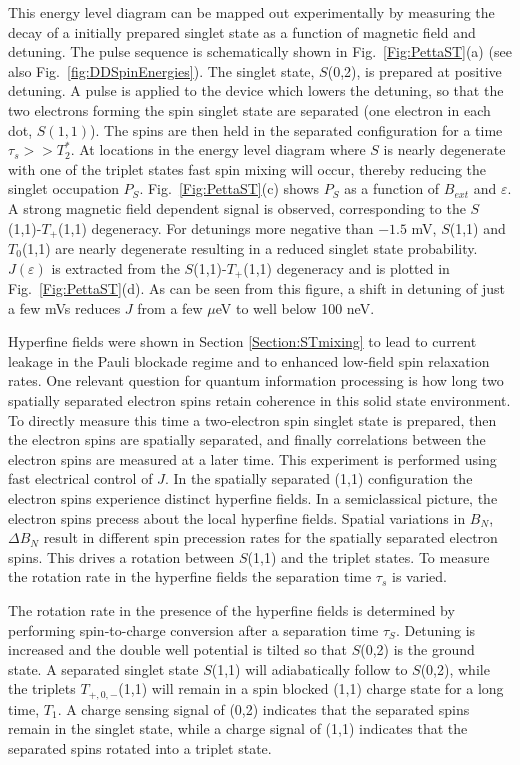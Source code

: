 \documentclass[rmp,twocolumn,aps]{revtex4}
\begin{document}
This energy level diagram can be mapped out experimentally by
measuring the decay of a initially prepared singlet state as a
function of magnetic field and detuning. The pulse sequence is
schematically shown in Fig.~\ref{Fig:PettaST}(a) (see also Fig.~\ref{fig:DDSpinEnergies}). The singlet
state, $S$(0,2), is prepared at positive detuning. A pulse is
applied to the device which lowers the detuning, so that the two electrons forming the spin singlet state are separated (one electron in each dot, $S(1,1)$). The spins are then held in the separated
configuration for a time $\tau_s$$>>$$T_2^*$. At locations in the
energy level diagram where $S$ is nearly degenerate with one of the
triplet states fast spin mixing will occur, thereby reducing the singlet occupation $P_S$. Fig.~\ref{Fig:PettaST}(c) shows $P_S$ as a function of $B_{ext}$ and $\varepsilon$. A strong magnetic field dependent signal is observed,
corresponding to the $S$(1,1)-$T_+$(1,1) degeneracy. For detunings
more negative than $-1.5$ mV, $S$(1,1) and $T_0$(1,1) are nearly degenerate
resulting in a reduced singlet state probability. $J(\varepsilon)$ is
extracted from the $S$(1,1)-$T_+$(1,1) degeneracy and is plotted in
Fig.~\ref{Fig:PettaST}(d). As can be seen from this figure, a shift in detuning of just a few mVs reduces $J$
from a few $\mu$eV to well below 100 neV.

Hyperfine fields were shown in Section \ref{Section:STmixing} to
lead to current leakage in the Pauli blockade regime and to enhanced
low-field spin relaxation rates. One relevant question for quantum information processing is how long two spatially separated electron spins retain coherence in this solid state environment. To directly
measure this time a two-electron spin singlet state is prepared, then the electron spins are spatially separated, and finally
correlations between the electron spins are measured at a later time. This
experiment is performed using fast electrical control of $J$. In the spatially separated (1,1)
configuration the electron spins experience distinct hyperfine
fields. In a semiclassical picture, the electron spins precess
about the local hyperfine fields. Spatial variations in $B_{N}$, $\Delta B_{N}$
result in different spin precession rates for the spatially
separated electron spins. This drives a rotation between $S$(1,1)
and the triplet states. To measure the rotation rate in the hyperfine
fields the separation time $\tau_s$ is varied.

The rotation rate in the presence of the hyperfine fields is
determined by performing spin-to-charge conversion after a
separation time $\tau_S$. Detuning is increased and the double
well potential is tilted so that $S$(0,2) is the ground state. A
separated singlet state $S$(1,1) will adiabatically follow to
$S$(0,2), while the triplets $T_{+,0,-}$(1,1) will remain in a spin
blocked (1,1) charge state for a long time, $T_1$. A charge sensing
signal of (0,2) indicates that the separated spins remain in the
singlet state, while a charge signal of (1,1) indicates that the
separated spins rotated into a triplet state.
\end{document}
